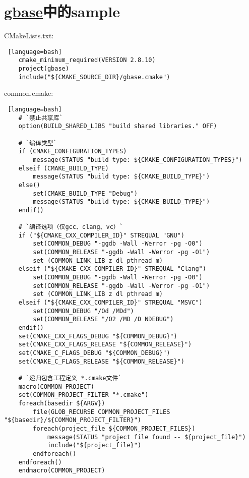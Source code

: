 \section{\ZHH \href{https://github.com/gaccob/gbase}{gbase}中的sample}{
{CMakeLists.txt:} \par
\begin{lstlisting} [language=bash]
    cmake_minimum_required(VERSION 2.8.10)
    project(gbase)
    include("${CMAKE_SOURCE_DIR}/gbase.cmake")
\end{lstlisting}

{common.cmake:} \par
\begin{lstlisting} [language=bash]
    # `禁止共享库`
    option(BUILD_SHARED_LIBS "build shared libraries." OFF)

    # `编译类型`
    if (CMAKE_CONFIGURATION_TYPES)
        message(STATUS "build type: ${CMAKE_CONFIGURATION_TYPES}")
    elseif (CMAKE_BUILD_TYPE)
        message(STATUS "build type: ${CMAKE_BUILD_TYPE}")
    else()
        set(CMAKE_BUILD_TYPE "Debug")
        message(STATUS "build type: ${CMAKE_BUILD_TYPE}")
    endif()

    # `编译选项（仅gcc、clang、vc）`
    if ("${CMAKE_CXX_COMPILER_ID}" STREQUAL "GNU")
        set(COMMON_DEBUG "-ggdb -Wall -Werror -pg -O0")
        set(COMMON_RELEASE "-ggdb -Wall -Werror -pg -O1")
        set (COMMON_LINK_LIB z dl pthread m)
    elseif ("${CMAKE_CXX_COMPILER_ID}" STREQUAL "Clang")
        set(COMMON_DEBUG "-ggdb -Wall -Werror -pg -O0")
        set(COMMON_RELEASE "-ggdb -Wall -Werror -pg -O1")
        set (COMMON_LINK_LIB z dl pthread m)
    elseif ("${CMAKE_CXX_COMPILER_ID}" STREQUAL "MSVC")
        set(COMMON_DEBUG "/Od /MDd")
        set(COMMON_RELEASE "/O2 /MD /D NDEBUG")
    endif()
    set(CMAKE_CXX_FLAGS_DEBUG "${COMMON_DEBUG}")
    set(CMAKE_CXX_FLAGS_RELEASE "${COMMON_RELEASE}")
    set(CMAKE_C_FLAGS_DEBUG "${COMMON_DEBUG}")
    set(CMAKE_C_FLAGS_RELEASE "${COMMON_RELEASE}")

    # `递归包含工程定义 *.cmake文件`
    macro(COMMON_PROJECT)
    set(COMMON_PROJECT_FILTER "*.cmake")
    foreach(basedir ${ARGV})
        file(GLOB_RECURSE COMMON_PROJECT_FILES "${basedir}/${COMMON_PROJECT_FILTER}")
        foreach(project_file ${COMMON_PROJECT_FILES})
            message(STATUS "project file found -- ${project_file}")
            include("${project_file}")
        endforeach()
    endforeach()
    endmacro(COMMON_PROJECT)


\end{lstlisting}}
